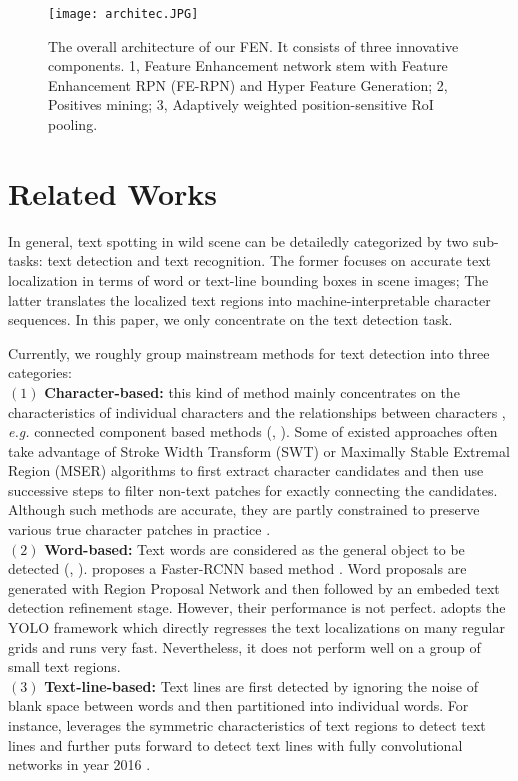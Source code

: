 \documentclass[letterpaper]{article}
\begin{document}
\begin{figure*}[t]
\begin{center}
\texttt{[image: architec.JPG]}
\caption{The overall architecture of our FEN. It consists of three innovative components. 1, Feature Enhancement network stem with Feature Enhancement RPN (FE-RPN) and Hyper Feature Generation; 2, Positives mining; 3, Adaptively weighted position-sensitive RoI pooling.}\label{fig:quaR}
\end{center}
\end{figure*}

\section{Related Works}
In general, text spotting in wild scene can be detailedly categorized by two sub-tasks: text detection and text recognition. The former focuses on accurate text localization in terms of word or text-line bounding boxes in scene images; The latter translates the localized text regions into machine-interpretable character sequences. In this paper, we only concentrate on the text detection task.

Currently, we roughly group mainstream methods for text detection into three categories: \\
$\left(1\right)$ \textbf{Character-based:} this kind of method mainly concentrates on the characteristics of individual characters and the relationships between characters \cite{zhu2016scene}, \textit{e.g.} connected component based methods (\cite{zamberletti2014text}, \cite{shi2013scene}). Some of existed approaches often take advantage of Stroke Width Transform (SWT) \cite{huang2013text} or Maximally Stable Extremal Region (MSER) \cite{nister2008linear} algorithms to first extract character candidates and then use successive steps to filter non-text patches for exactly connecting the candidates. Although such methods are accurate, they are partly constrained to preserve various true character patches in practice \cite{cho2016canny}.\\
$\left(2\right)$ \textbf{Word-based:} Text words are considered as the general object to be detected (\cite{zhong2016deeptext}, \cite{gomez2017textproposals}). \cite{zhong2016deeptext} proposes a Faster-RCNN based method \cite{ren2015faster}. Word proposals are generated with Region Proposal Network and then followed by an embeded text detection refinement stage. However, their performance is not perfect. \cite{gupta2016synthetic} adopts the YOLO framework \cite{redmon2016you} which directly regresses the text localizations on many regular grids and runs very fast. Nevertheless, it does not perform well on a group of small text regions.\\
$\left(3\right)$ \textbf{Text-line-based:} Text lines are first detected by ignoring the noise of blank space between words and then partitioned into individual words. For instance, \cite{zhang2015symmetry} leverages the symmetric characteristics of text regions to detect text lines and further puts forward to detect text lines with fully convolutional networks \cite{long2015fully} in year 2016 \cite{zhang2016multi}.
\end{document}

